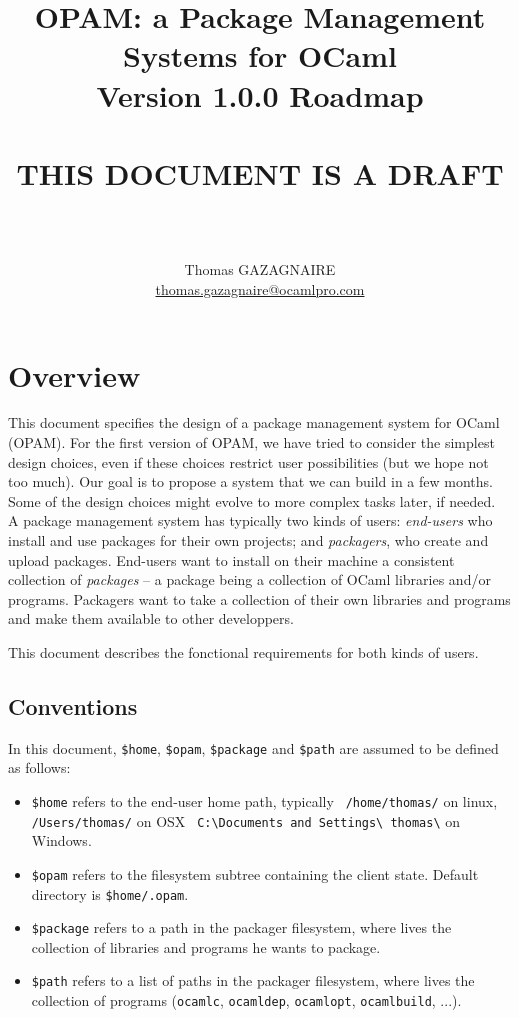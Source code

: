\documentclass[a4paper,11pt]{article}
\title{

OPAM: a Package Management Systems for OCaml\\
Version 1.0.0 Roadmap\\ ~\ \\
THIS DOCUMENT IS A DRAFT\\
~\ \\}
\author{Thomas GAZAGNAIRE\\
\url{thomas.gazagnaire@ocamlpro.com}\\
}
\begin{document}
\maketitle

\vfill

\tableofcontents

\section*{Overview}

This document specifies the design of a package management system for
OCaml (OPAM). For the first version of OPAM, we have tried to consider
the simplest design choices, even if these choices restrict user
possibilities (but we hope not too much). Our goal is to propose a
system that we can build in a few months. Some of the design choices
might evolve to more complex tasks later, if needed. \\

A package management system has typically two kinds of users: {\em
  end-users} who install and use packages for their own projects; and
{\em packagers}, who create and upload packages. End-users want to
install on their machine a consistent collection of {\em packages} --
a package being a collection of OCaml libraries and/or programs.
Packagers want to take a collection of their own libraries and
programs and make them available to other developpers.

This document describes the fonctional requirements for both kinds of
users.

\subsection*{Conventions}

In this document, \verb+$home+, \verb+$opam+, \verb+$package+ and 
\verb+$path+ are assumed to be defined as follows:

\begin{itemize}

\item {\tt \$home} refers to the end-user home path, typically {\tt
  /home/thomas/} on linux, {\tt /Users/thomas/} on OSX {\tt
  C:\textbackslash Documents and Settings\textbackslash
  thomas\textbackslash} on Windows.

\item {\tt \$opam} refers to the filesystem subtree containing the
  client state. Default directory is {\tt \$home/.opam}.

\item {\tt \$package} refers to a path in the packager filesystem, where
  lives the collection of libraries and programs he wants to package.

\item {\tt \$path} refers to a list of paths in the packager filesystem, where
  lives the collection of programs ({\tt ocamlc}, {\tt ocamldep}, {\tt ocamlopt}, 
  {\tt ocamlbuild}, ...).

\end{itemize}
\end{document}
